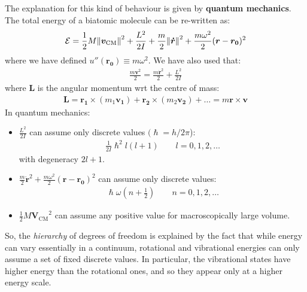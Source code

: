 \documentclass[../template.tex]{subfiles}
\begin{document}
The explanation for this kind of  behaviour is given by \textbf{quantum mechanics}. The total energy of a biatomic molecule can be re-written as:
\begin{align*}
    \mathcal{E} = \frac{1}{2} M \norm{\bm{v}_{\mathrm{CM} }}^2 + \frac{L^2}{2 I} + \frac{m}{2} \norm{\bm{\dot{r}}}^2 + \frac{m \omega^2}{2} (\bm{r} - \bm{r_0})^2   
\end{align*} 
where we have defined $u''(\bm{r_0}) \equiv m \omega^2$. We have also used that:
\begin{align*}
    \frac{m \bm{v}^2}{2} = \frac{m \bm{\dot{r}}^2}{2} + \frac{L^2}{2 I}   
\end{align*}
where $\bm{L}$ is the angular momentum wrt the centre of mass:
\begin{align*}
    \bm{L} = \bm{r_1} \times (m_1 \bm{v_1}) + \bm{r_2} \times (m_2 \bm{v_2}) + \dots = m \bm{r} \times \bm{v}
\end{align*}
In quantum mechanics:
\begin{itemize}
    \item $\frac{L^2}{2I}$ can assume only discrete values $(\hslash = h/2\pi$):
    \begin{align*}
        \frac{1}{2 I} \hslash^2 l(l+1) \qquad l = 0,1,2,\dots 
    \end{align*} 
    with degeneracy $2l+1$.
    \item $\displaystyle \frac{m}{2} \dot{\bm{r}}^2 + \frac{m \omega^2}{2} (\bm{r}-\bm{r_0})^2$ can assume only discrete values:  
    \begin{align*}
        \hslash \omega \left(n + \frac{1}{2} \right) \qquad n=0,1,2,\dots
    \end{align*}
    \item $\frac{1}{2} M \bm{V_{\mathrm{CM}}}^2$ can assume any positive value for macroscopically large volume. 
\end{itemize}
So, the \textit{hierarchy} of degrees of freedom is explained by the fact that while energy can vary essentially in a continuum, rotational and vibrational energies can only assume a set of fixed discrete values. In particular, the vibrational states have higher energy than the rotational ones, and so they appear only at a higher energy scale.

\medskip
\end{document}
